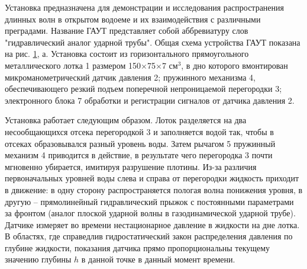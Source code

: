 \documentclass[specialist, subf, href, colorlinks=true, 14pt, final]{disser}
\theoremstyle{definition}
\begin{document}
Установка предназначена для демонстрации и исследования распространения длинных волн в открытом водоеме и их взаимодействия с различными преградами. Название ГАУТ представляет собой аббревиатуру слов "гидравлический аналог ударной трубы". Общая схема устройства ГАУТ показана на рис. \ref{1-4-4}, а. Установка состоит из горизонтального прямоугольного металлического лотка 1 размером 150$\times$75$\times$7 см$^3$, в дно которого вмонтирован микроманометрический датчик давления 2; пружинного механизма 4, обеспечивающего резкий подъем поперечной непроницаемой перегородки 3; электронного блока 7 обработки и регистрации сигналов от датчика давления 2.
\begin{figure}[!htp]
  \caption{}
  \label{1-4-4}
\end{figure}

Установка работает следующим образом. Лоток разделяется на два несообщающихся отсека перегородкой 3 и заполняется водой так, чтобы в отсеках образовывался разный уровень воды. Затем рычагом 5 пружинный механизм 4 приводится в действие, в результате чего перегородка 3 почти мгновенно убирается, имитируя разрушение плотины. Из-за различия первоначальных уровней воды слева и справа от перегородки жидкость приходит в движение: в одну сторону распространяется пологая волна понижения уровня, в другую -- прямолинейный гидравлический прыжок с постоянными параметрами за фронтом (аналог плоской ударной волны в  газодинамической ударной трубе). Датчике измеряет во времени нестационарное давление в жидкости на дне лотка. В областях, где  справедлив гидростатический закон распределения давления по глубине жидкости, показания датчика прямо пропорциональны текущему значению глубины $h$ в данной точке в данный момент времени.
\end{document}
